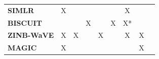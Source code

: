 \begin{table}
{\begin{small}
\begin{tabular}{lcccccccc}
\textbf{SIMLR}           &   X               &                                                                       &                       &                                                                   &                                                                     & X                                                                            &                     &                                                                            \\[0.2cm]
\textbf{BISCUIT}         &                  &                                                                       & X                     &                                                                   & X                                                                   & X*                                                                           &                     &                                                                            \\[0.2cm]
\textbf{ZINB-WaVE}       & X                & X                                                                     &                       & X                                                                 &                                                                     & X                                                                            & X                   &                                                                            \\[0.2cm]

\textbf{MAGIC}           & X                &                                                                       &                       &                                                                   &                                                                     &                                                                              & X                   &                                                                            \\[0.2cm]


\end{tabular}
\end{small}}
\end{table}
